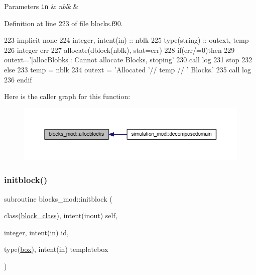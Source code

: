 \begin{DoxyParams}[1]{Parameters}
\mbox{\tt in}  & {\em nblk} & \\
\hline
\end{DoxyParams}


Definition at line 223 of file blocks.\+f90.


\begin{DoxyCode}
223     \textcolor{keywordtype}{implicit none}
224     \textcolor{keywordtype}{integer}, \textcolor{keywordtype}{intent(in)} ::  nblk
225     \textcolor{keywordtype}{type}(string) :: outext, temp
226     \textcolor{keywordtype}{integer} err
227     \textcolor{keyword}{allocate}(dblock(nblk), stat=err)
228     \textcolor{keywordflow}{if}(err/=0)\textcolor{keywordflow}{then}
229         outext=\textcolor{stringliteral}{'[allocBlobks]: Cannot allocate Blocks, stoping'}
230         \textcolor{keyword}{call }log%
231         stop
232     \textcolor{keywordflow}{else}
233         temp = nblk
234         outext = \textcolor{stringliteral}{'Allocated '}// temp // \textcolor{stringliteral}{' Blocks.'}
235         \textcolor{keyword}{call }log%
236 \textcolor{keywordflow}{    endif}
\end{DoxyCode}
Here is the caller graph for this function\+:\nopagebreak
\begin{figure}[H]
\begin{center}
\leavevmode
\includegraphics[width=350pt]{namespaceblocks__mod_a639beb0fee2290d46353f4b4702d6711_icgraph}
\end{center}
\end{figure}
\mbox{\label{namespaceblocks__mod_a534ca69b17b6f54ee07f995b02feff39}} 
\subsubsection{\texorpdfstring{initblock()}{initblock()}}
{\footnotesize\ttfamily subroutine blocks\+\_\+mod\+::initblock (\begin{DoxyParamCaption}\item[{class(\mbox{\hyperlink{structblocks__mod_1_1block__class}{block\+\_\+class}}), intent(inout)}]{self,  }\item[{integer, intent(in)}]{id,  }\item[{type(\mbox{\hyperlink{structgeometry__mod_1_1box}{box}}), intent(in)}]{templatebox }\end{DoxyParamCaption})\hspace{0.3cm}{\ttfamily [private]}}



